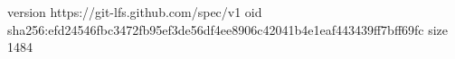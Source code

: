 version https://git-lfs.github.com/spec/v1
oid sha256:efd24546fbc3472fb95ef3de56df4ee8906c42041b4e1eaf443439ff7bff69fc
size 1484
